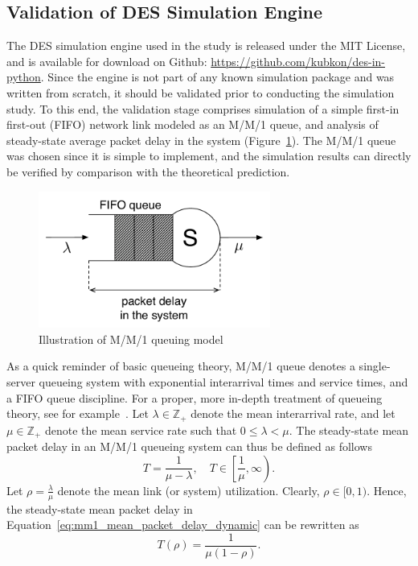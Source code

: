 \subsection{Validation of DES Simulation Engine} %
\label{sub:validation_of_des_simulation_engine_dynamic}
The DES simulation engine used in the study is released under the MIT License, and is available for download on Github: \url{https://github.com/kubkon/des-in-python}. Since the engine is not part of any known simulation package and was written from scratch, it should be validated prior to conducting the simulation study. To this end, the validation stage comprises simulation of a simple first-in first-out (FIFO) network link modeled as an M/M/1 queue, and analysis of steady-state average packet delay in the system (Figure~\ref{fig:mm1_queue_dynamic}). The M/M/1 queue was chosen since it is simple to implement, and the simulation results can directly be verified by comparison with the theoretical prediction.

\begin{figure}[t]
	\includegraphics[width=3in]{3/Figures/mm1_queue}
	\caption{Illustration of M/M/1 queuing model}
	\label{fig:mm1_queue_dynamic}
\end{figure}

As a quick reminder of basic queueing theory, M/M/1 queue denotes a single-server queueing system with exponential interarrival times and service times, and a FIFO queue discipline. For a proper, more in-depth treatment of queueing theory, see for example~\cite{CassandrasLafortune2008}. Let $\lambda\in\mathbb{Z}_+$ denote the mean interarrival rate, and let $\mu\in\mathbb{Z}_+$ denote the mean service rate such that $0 \le \lambda < \mu$. The steady-state mean packet delay in an M/M/1 queueing system can thus be defined as follows
\begin{equation}
	\label{eq:mm1_mean_packet_delay_dynamic}
	T = \frac{1}{\mu - \lambda},\quad T\in\displaystyle\left[\frac{1}{\mu}, \infty\right).
\end{equation}
Let $\rho = \displaystyle\frac{\lambda}{\mu}$ denote the mean link (or system) utilization. Clearly, $\rho\in [0,1)$. Hence, the steady-state mean packet delay in Equation~\eqref{eq:mm1_mean_packet_delay_dynamic} can be rewritten as
\begin{equation}
	\label{eq:mm1_mean_packet_delay_2_dynamic}
	T(\rho) = \frac{1}{\mu(1 - \rho)}.
\end{equation}

